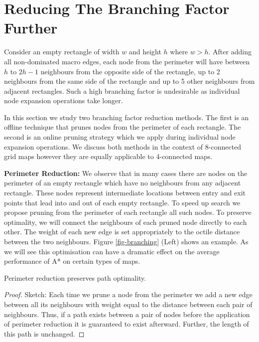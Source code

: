 \section{Reducing The Branching Factor Further}
Consider an empty rectangle of width $w$ and height $h$ where $w > h$.  After
adding all non-dominated macro edges, each node from the perimeter will have
between $h$ to $2h-1$ neighbours from the opposite side of the rectangle, up to
2 neighbours from the same side of the rectangle and up to 5 other neighbours
from adjacent rectangles.  Such a high branching factor is undesirable as
individual node expansion operations take longer.

In this section we study two branching factor reduction methods.  The first is
an offline technique that prunes nodes from the perimeter of each rectangle.
The second is an online pruning strategy which we apply during individual node
expansion operations.  We discuss both methods in the context of 8-connected
grid maps however they are equally applicable to 4-connected maps.

\noindent
\textbf{Perimeter Reduction:}
We observe that in many cases there are nodes on the perimeter of an empty
rectangle which have no neighbours from any adjacent rectangle.  These nodes
represent intermediate locations between entry and exit points that lead into
and out of each empty rectangle. To speed up search we propose pruning from the
perimeter of each rectangle all such nodes.  To preserve optimality, we will
connect the neighbours of each pruned node directly to each other.  The weight
of each new edge is set appropriately to the octile distance between the two
neighbours.  Figure \ref{fig-branching} (Left) shows an example.  As we will see
this optimisation can have a dramatic effect on the average performance of A* on
certain types of maps.

\begin{lemma}
Perimeter reduction preserves path optimality.
\end{lemma}
\begin{proof}
Sketch: Each time we prune a node from the perimeter we add a new edge between
all its neighbours with weight equal to the distance between each pair
of neighbours.  Thus, if a path exists between a pair of nodes before the
application of perimeter reduction it is guaranteed to exist afterward.
Further, the length of this path is unchanged.
\end{proof}

